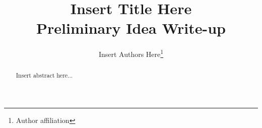 \newcommand*{\MyHeaderPath}{.}%
\newcommand*{\PathToAssets}{../assets}%
\newcommand*{\PathToOutput}{../output/}%








\title{
Insert Title Here
\\{\color{blue} \large Preliminary Idea Write-up}
}

\author{
Insert Authors Here\footnote{Author affiliation}
}
\begin{titlepage}
% 
\maketitle


\begin{abstract}
Insert abstract here...
\end{abstract}


\end{titlepage}

